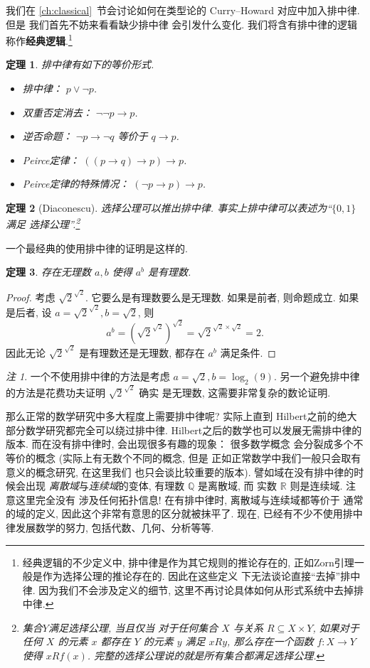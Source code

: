 \documentclass[UTF8]{ctexbook}
\theoremstyle{plain}
\newtheorem{theorem}{定理}[chapter]
\theoremstyle{definition}
\theoremstyle{remark}
\newtheorem*{remark}{注}
\begin{document}
我们在 \ref{ch:classical}~节会讨论如何在类型论的
Curry--Howard 对应中加入排中律. 但是
我们首先不妨来看看缺少排中律
会引发什么变化. 我们将含有排中律的逻辑
称作\textbf{经典逻辑}.\footnote{经典逻辑的不少定义中,
排中律是作为其它规则的推论存在的,
正如Zorn引理一般是作为选择公理的推论存在的. 因此在这些定义
下无法谈论直接“去掉”排中律. 因为我们不会涉及定义的细节,
这里不再讨论具体如何从形式系统中去掉排中律.}
\begin{theorem}
排中律有如下的等价形式.
\begin{itemize}
\item 排中律： \(p \vee \neg p\).
\item 双重否定消去： \(\neg\neg p \to p\).
\item 逆否命题： \(\neg p \to \neg q\) 等价于 \(q \to p\).
\item Peirce定律： \(((p \to q) \to p) \to p\).
\item Peirce定律的特殊情况： \((\neg p\to p) \to p\).
\end{itemize}
\end{theorem}
\begin{theorem}[Diaconescu]
选择公理可以推出排中律.
事实上排中律可以表述为“\(\{0,1\}\)满足
选择公理”.\footnote{集合\(Y\)满足选择公理, 当且仅当
对于任何集合 \(X\) 与关系 \(R \subseteq X \times Y\), 如果对于
任何 \(X\) 的元素 \(x\) 都存在 \(Y\) 的元素 \(y\)
满足 \(xRy\), 那么存在一个函数 \(f : X \to Y\) 使得
\(xRf(x)\). 完整的选择公理说的就是所有集合都满足选择公理.}
\end{theorem}

一个最经典的使用排中律的证明是这样的.
\begin{theorem}
存在无理数 \(a,b\) 使得 \(a^b\) 是有理数.
\end{theorem}
\begin{proof}
考虑 \({\sqrt2}^{\sqrt2}\). 它要么是有理数要么是无理数.
如果是前者, 则命题成立. 如果是后者, 设 \(a = {\sqrt2}^{\sqrt2},
b = \sqrt 2\), 则
\[a^b = \left({\sqrt2}^{\sqrt2}\right)^{\sqrt2} = {\sqrt2}^{\sqrt2\times\sqrt2} = 2.\]
因此无论 \({\sqrt2}^{\sqrt2}\) 是有理数还是无理数,
都存在 \(a^b\) 满足条件.
\end{proof}
\begin{remark}
一个不使用排中律的方法是考虑 \(a = \sqrt 2, b = \log_2(9)\).
另一个避免排中律的方法是花费功夫证明 \({\sqrt2}^{\sqrt2}\) 确实
是无理数, 这需要非常复杂的数论证明.
\end{remark}

那么正常的数学研究中多大程度上需要排中律呢? 实际上直到
Hilbert之前的绝大部分数学研究都完全可以绕过排中律.
Hilbert之后的数学也可以发展无需排中律的版本.
而在没有排中律时, 会出现很多有趣的现象： 很多数学概念
会分裂成多个不等价的概念 (实际上有无数个不同的概念, 但是
正如正常数学中我们一般只会取有意义的概念研究, 在这里我们
也只会谈比较重要的版本). 譬如域在没有排中律的时候会出现%
\emph{离散域}与\emph{连续域}的变体, 有理数
\(\mathbb Q\) 是离散域, 而
实数 \(\mathbb R\) 则是连续域. 注意这里完全没有
涉及任何拓扑信息! 在有排中律时, 离散域与连续域都等价于
通常的域的定义, 因此这个非常有意思的区分就被抹平了.
现在, 已经有不少不使用排中律发展数学的努力,
包括代数、几何、分析等等.
\end{document}
